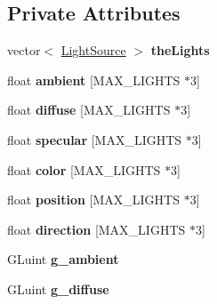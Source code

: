 \subsection*{Private Attributes}
\begin{DoxyCompactItemize}
\item 
\hypertarget{class_lights_a902e37f0512d3bf9771472fe564bdac1}{vector$<$ \hyperlink{class_light_source}{Light\-Source} $>$ {\bfseries the\-Lights}}\label{class_lights_a902e37f0512d3bf9771472fe564bdac1}

\item 
\hypertarget{class_lights_ad0f2d47f1de042ecbd83b70662e48245}{float {\bfseries ambient} \mbox{[}M\-A\-X\-\_\-\-L\-I\-G\-H\-T\-S $\ast$3\mbox{]}}\label{class_lights_ad0f2d47f1de042ecbd83b70662e48245}

\item 
\hypertarget{class_lights_ac4f62eef960d636cab994b47f184b98a}{float {\bfseries diffuse} \mbox{[}M\-A\-X\-\_\-\-L\-I\-G\-H\-T\-S $\ast$3\mbox{]}}\label{class_lights_ac4f62eef960d636cab994b47f184b98a}

\item 
\hypertarget{class_lights_a2d946118ffd51b769a205bb57d614d8f}{float {\bfseries specular} \mbox{[}M\-A\-X\-\_\-\-L\-I\-G\-H\-T\-S $\ast$3\mbox{]}}\label{class_lights_a2d946118ffd51b769a205bb57d614d8f}

\item 
\hypertarget{class_lights_afd97d2f8d29109ed6f5ce91fd2597590}{float {\bfseries color} \mbox{[}M\-A\-X\-\_\-\-L\-I\-G\-H\-T\-S $\ast$3\mbox{]}}\label{class_lights_afd97d2f8d29109ed6f5ce91fd2597590}

\item 
\hypertarget{class_lights_ad4a7fd9b32f053f20763ff848056a771}{float {\bfseries position} \mbox{[}M\-A\-X\-\_\-\-L\-I\-G\-H\-T\-S $\ast$3\mbox{]}}\label{class_lights_ad4a7fd9b32f053f20763ff848056a771}

\item 
\hypertarget{class_lights_ae61432466e301a6d2022a60b7a42f18f}{float {\bfseries direction} \mbox{[}M\-A\-X\-\_\-\-L\-I\-G\-H\-T\-S $\ast$3\mbox{]}}\label{class_lights_ae61432466e301a6d2022a60b7a42f18f}

\item 
\hypertarget{class_lights_af218e33519edf70135e4f67387438417}{G\-Luint {\bfseries g\-\_\-ambient}}\label{class_lights_af218e33519edf70135e4f67387438417}

\item 
\hypertarget{class_lights_aebfc32c653fd56af4e9181453b51bcc9}{G\-Luint {\bfseries g\-\_\-diffuse}}\label{class_lights_aebfc32c653fd56af4e9181453b51bcc9}


\end{DoxyCompactItemize}
